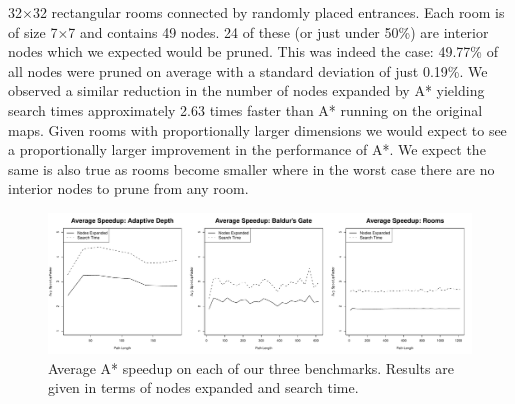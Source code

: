32$\times$32 rectangular rooms connected by randomly placed entrances.
Each room is of size 7$\times$7 and contains 49 nodes.  24 of these
(or just under 50\%) are interior nodes which we expected would be
pruned.  This was indeed the case: 49.77\% of all nodes were pruned
on average with a standard deviation of just 0.19\%.  We observed
a similar reduction in the number of nodes expanded by A* yielding
search times approximately 2.63 times faster than A* running on the
original maps.  Given rooms with proportionally larger dimensions
we would expect to see a proportionally larger improvement in the
performance of A*.  We expect the same is also true as rooms become
smaller where in the worst case there are no interior nodes to prune
from any room.

\begin{figure}[t]
       \begin{center}
                       \includegraphics[width=1.95\columnwidth, trim = 10mm 10mm 10mm 0mm]{diagrams/speedup.pdf}
       \end{center}
       \caption{Average A* speedup on each of our three benchmarks. 
		Results are given in terms of nodes expanded and search time.}
\label{fig-speedup}
\end{figure}
